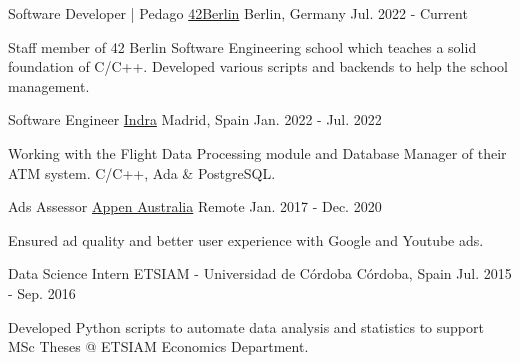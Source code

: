 

\begin{cventries}
  \cventry
    {Software Developer | Pedago}
    {\href{https://42berlin.de}{42Berlin}}
    {Berlin, Germany}
    {Jul. 2022 - Current}
     {
      \begin{cvitems}
        \item {Staff member of 42 Berlin Software Engineering school which teaches a solid foundation of C/C++. Developed various scripts and backends to help the school management.}
      \end{cvitems}
    }

  \cventry
    {Software Engineer}
    {\href{https://www.indracompany.com/en/air-traffic-control-automation-system-0}{Indra}}
    {Madrid, Spain}
    {Jan. 2022 - Jul. 2022}
     {
      \begin{cvitems}
        \item {Working with the Flight Data Processing module and Database Manager of their ATM system. C/C++, Ada \& PostgreSQL.}
      \end{cvitems}
    }


  \cventry
    {Ads Assessor}
    {\href{https://appen.com/}{Appen Australia}}
    {Remote}
    {Jan. 2017 - Dec. 2020}
     {
      \begin{cvitems}
        \item {Ensured ad quality and better user experience with Google and Youtube ads.}
      \end{cvitems}
    }

  \cventry
    {Data Science Intern}
    {ETSIAM - Universidad de Córdoba}
    {Córdoba, Spain}
    {Jul. 2015 - Sep. 2016}
     {
      \begin{cvitems}
        \item {Developed Python scripts to automate data analysis and statistics to support MSc Theses @ ETSIAM Economics Department.}
      \end{cvitems}
    }


\end{cventries}
